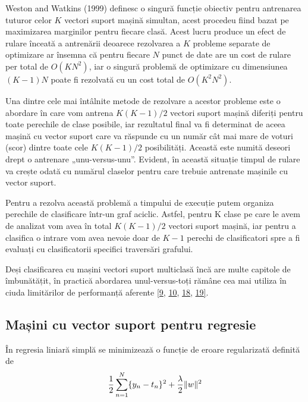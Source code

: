 Weston and Watkins (1999) definesc o singură funcție obiectiv pentru antrenarea tuturor celor $K$ vectori suport mașină simultan, acest procedeu fiind bazat pe maximizarea marginilor pentru fiecare clasă. Acest lucru produce un efect de rulare înceată a antrenării deoarece rezolvarea a $K$ probleme separate de optimizare ar însemna că pentru fiecare $N$ punct de date are un cost de rulare per total de $O(KN^2)$, iar o singură problemă de optimizare cu dimensiunea $(K - 1)N$ poate fi rezolvată cu un cost total de $O(K^2N^2)$.

Una dintre cele mai întâlnite metode de rezolvare a acestor probleme este o abordare în care vom antrena $K(K-1)/2$ vectori suport mașină diferiți pentru toate perechile de clase posibile, iar rezultatul final va fi determinat de aceea mașină cu vector suport care va răspunde cu un număr cât mai mare de voturi (scor) dintre toate cele $K(K-1)/2$ posibilități. Această este numită deseori drept o antrenare „unu-versus-unu”. Evident, în această situație timpul de rulare va crește odată cu numărul claselor pentru care trebuie antrenate mașinile cu vector suport.

Pentru a rezolva această problemă a timpului de execuție putem organiza perechile de clasificare într-un graf aciclic. Astfel, pentru K clase pe care le avem de analizat vom avea în total $K(K-1)/2$ vectori suport mașină, iar pentru a clasifica o intrare vom avea nevoie doar de $K-1$ perechi de clasificatori spre a fi evaluați cu clasificatorii specifici traversări grafului.

Deși clasificarea cu mașini vectori suport multiclasă încă are multe capitole de îmbunătățit, în practică abordarea unul-versus-toți rămâne cea mai utiliza în ciuda limitărilor de performanță aferente \hyperlink{ErinAllweinRobertSchapireYoramSinger}{[9}, \hyperlink{JasonWestonSimonWatkins}{10}, \hyperlink{ThomasDietterichGhulumBakiri}{18}, \hyperlink{VladimirVapnik}{19]}.

\subsection{Mașini cu vector suport pentru regresie}

În regresia liniară simplă se minimizează o funcție de eroare regularizată definită de
\begin{align}
	\frac{1}{2}\sum_{n=1}^{N}\{y_n-t_n\}^2+\frac{\lambda}{2}\lVert w\rVert^2
\end{align}

